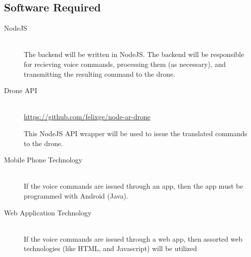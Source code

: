 \documentclass{article}
\begin{document}
	\subsection{Software Required}
	\begin{description}
	  \item[NodeJS] \hfill \\
	  The backend will be written in NodeJS. The backend will be responsible for recieving voice commands, processing them (as necessary), and transmitting the resulting command to the drone. 
	  \item[Drone API] \hfill \\
	  \url{https://github.com/felixge/node-ar-drone}

	  This NodeJS API wrapper will be used to issue the translated commands to the drone. 

	  \item[Mobile Phone Technology] \hfill \\
	  If the voice commands are issued through an app, then the app must be programmed with Android (Java). 

	  \item[Web Application Technology] \hfill \\
	  If the voice commands are issued through a web app, then assorted web technologies (like HTML, and Javascript) will be utilized 
	\end{description}

\end{document}
